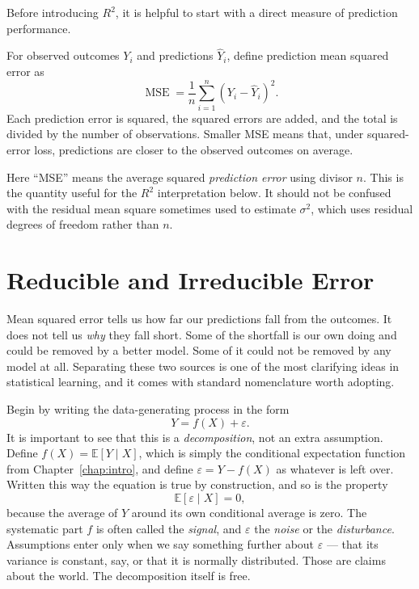 \documentclass[11pt]{report}
\newcommand{\E}{\mathbb{E}}
\newcommand{\MSE}{\operatorname{MSE}}
\begin{document}
Before introducing \(R^2\), it is helpful to start with a direct measure of prediction performance.

For observed outcomes \(Y_i\) and predictions \(\widehat{Y}_i\), define prediction mean squared error as
\[
\MSE
=
\frac{1}{n}
\sum_{i=1}^{n}
(Y_i-\widehat{Y}_i)^2.
\]
Each prediction error is squared, the squared errors are added, and the total is divided by the number of observations. Smaller MSE means that, under squared-error loss, predictions are closer to the observed outcomes on average.

Here ``MSE'' means the average squared \emph{prediction error} using divisor \(n\). This is the quantity useful for the \(R^2\) interpretation below. It should not be confused with the residual mean square sometimes used to estimate \(\sigma^2\), which uses residual degrees of freedom rather than \(n\).

\section{Reducible and Irreducible Error}

Mean squared error tells us how far our predictions fall from the outcomes. It does not tell us \emph{why} they fall short. Some of the shortfall is our own doing and could be removed by a better model. Some of it could not be removed by any model at all. Separating these two sources is one of the most clarifying ideas in statistical learning, and it comes with standard nomenclature worth adopting.

Begin by writing the data-generating process in the form
\[
Y=f(X)+\varepsilon .
\]
It is important to see that this is a \emph{decomposition}, not an extra assumption. Define \(f(X)=\E[Y\mid X]\), which is simply the conditional expectation function from Chapter~\ref{chap:intro}, and define \(\varepsilon=Y-f(X)\) as whatever is left over. Written this way the equation is true by construction, and so is the property
\[
\E[\varepsilon\mid X]=0 ,
\]
because the average of \(Y\) around its own conditional average is zero. The systematic part \(f\) is often called the \emph{signal}, and \(\varepsilon\) the \emph{noise} or the \emph{disturbance}. Assumptions enter only when we say something further about \(\varepsilon\) --- that its variance is constant, say, or that it is normally distributed. Those are claims about the world. The decomposition itself is free.
\end{document}
